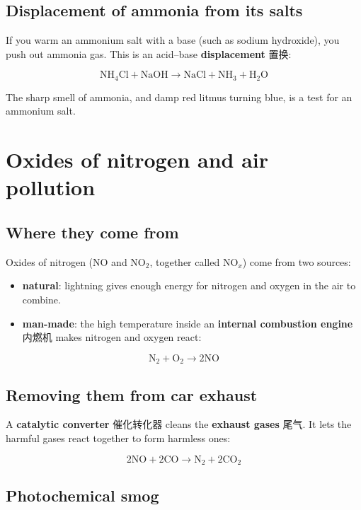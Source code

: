 \documentclass[11pt]{article}
\begin{document}
\subsection*{Displacement of ammonia from its salts}

If you warm an ammonium salt with a base (such as sodium hydroxide), you push out ammonia gas. This is an acid–base \textbf{displacement} 置换:

\[
\text{NH}_4\text{Cl} + \text{NaOH} \rightarrow \text{NaCl} + \text{NH}_3 + \text{H}_2\text{O}
\]

The sharp smell of ammonia, and damp red litmus turning blue, is a test for an ammonium salt.

\section*{Oxides of nitrogen and air pollution}

\subsection*{Where they come from}

Oxides of nitrogen ($\text{NO}$ and $\text{NO}_2$, together called $\text{NO}_x$) come from two sources:

\begin{itemize}
\item \textbf{natural}: lightning gives enough energy for nitrogen and oxygen in the air to combine.

\item \textbf{man-made}: the high temperature inside an \textbf{internal combustion engine} 内燃机 makes nitrogen and oxygen react:

\end{itemize}

\[
\text{N}_2 + \text{O}_2 \rightarrow 2\text{NO}
\]

\subsection*{Removing them from car exhaust}

A \textbf{catalytic converter} 催化转化器 cleans the \textbf{exhaust gases} 尾气. It lets the harmful gases react together to form harmless ones:

\[
2\text{NO} + 2\text{CO} \rightarrow \text{N}_2 + 2\text{CO}_2
\]

\subsection*{Photochemical smog}
\end{document}
